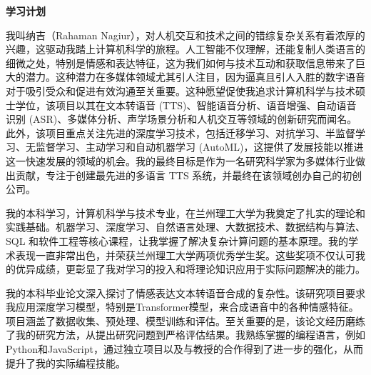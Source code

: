 \documentclass[12pt,a4paper]{article}
\begin{document}
\begin{CJK*}{UTF8}{gbsn}
    \thispagestyle{plain}

    \fontsize{14}{16}\selectfont

\begin{center}

    \Huge{ \bfseries{ 学习计划}}



    \vspace*{1cm}

    
\end{center}



\onehalfspacing


我叫纳吉（Rahaman Nagiur），对人机交互和技术之间的错综复杂关系有着浓厚的兴趣，这驱动我踏上计算机科学的旅程。人工智能不仅理解，还能复制人类语言的细微之处，特别是情感和表达特征，这为我们如何与技术互动和获取信息带来了巨大的潜力。这种潜力在多媒体领域尤其引人注目，因为逼真且引人入胜的数字语音对于吸引受众和促进有效沟通至关重要。这种愿望促使我追求计算机科学与技术硕士学位，该项目以其在文本转语音 (TTS)、智能语音分析、语音增强、自动语音识别 (ASR)、多媒体分析、声学场景分析和人机交互等领域的创新研究而闻名。此外，该项目重点关注先进的深度学习技术，包括迁移学习、对抗学习、半监督学习、无监督学习、主动学习和自动机器学习 (AutoML)，这提供了发展技能以推进这一快速发展的领域的机会。我的最终目标是作为一名研究科学家为多媒体行业做出贡献，专注于创建最先进的多语言 TTS 系统，并最终在该领域创办自己的初创公司。\newline

我的本科学习，计算机科学与技术专业，在兰州理工大学为我奠定了扎实的理论和实践基础。机器学习、深度学习、自然语言处理、大数据技术、数据结构与算法、SQL 和软件工程等核心课程，让我掌握了解决复杂计算问题的基本原理。我的学术表现一直非常出色，并荣获兰州理工大学两项优秀学生奖。这些奖项不仅认可我的优异成绩，更彰显了我对学习的投入和将理论知识应用于实际问题解决的能力。\newline

 我的本科毕业论文深入探讨了情感表达文本转语音合成的复杂性。该研究项目要求我应用深度学习模型，特别是Transformer模型，来合成语音中的各种情感特征。项目涵盖了数据收集、预处理、模型训练和评估。至关重要的是，该论文经历磨练了我的研究方法，从提出研究问题到严格评估结果。我熟练掌握的编程语言，例如Python和JavaScript，通过独立项目以及与教授的合作得到了进一步的强化，从而提升了我的实际编程技能。\newline



\end{CJK*}
\end{document}
